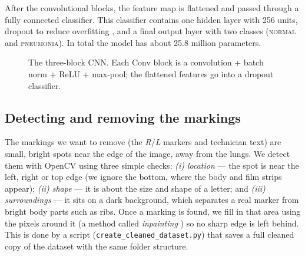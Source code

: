 \documentclass[10pt,twocolumn]{article}
\begin{document}
After the convolutional blocks, the feature map is flattened and passed through a
fully connected classifier. This classifier contains one hidden layer with 256
units, dropout to reduce overfitting \cite{srivastava2014dropout}, and a final
output layer with two classes (\textsc{normal} and \textsc{pneumonia}). In total
the model has about 25.8 million parameters.

\begin{figure}[t]
\centering
{}
\caption{The three-block CNN. Each Conv block is a convolution + batch norm +
ReLU + max-pool; the flattened features go into a dropout classifier.}
\label{fig:arch}
\end{figure}

\subsection{Detecting and removing the markings}
\label{sec:cleaning}
The markings we want to remove (the \emph{R}/\emph{L} markers and technician text)
are small, bright spots near the edge of the image, away from the lungs. We detect
them with OpenCV \cite{bradski2000opencv} using three simple checks:
\emph{(i) location} --- the spot is near the left, right or top edge (we ignore the
bottom, where the body and film strips appear); \emph{(ii) shape} --- it is about
the size and shape of a letter; and \emph{(iii) surroundings} --- it sits on a dark
background, which separates a real marker from bright body parts such as ribs.
Once a marking is found, we fill in that area using the pixels around it (a method
called \emph{inpainting} \cite{telea2004inpaint}) so no sharp edge is left behind.
This is done by a script (\texttt{create\_cleaned\_dataset.py}) that saves a full
cleaned copy of the dataset with the same folder structure.
\end{document}
